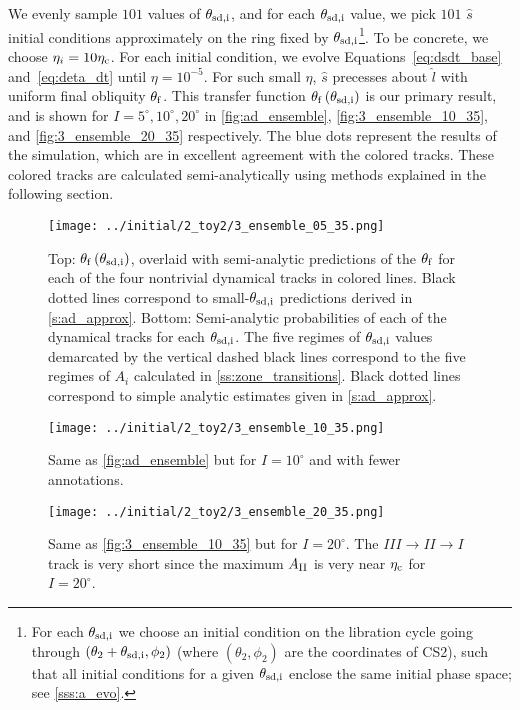 \documentclass[
        fleqn,
        usenatbib,
        referee,
    ]{mnras}
\newcommand*{\p}[1]{\left(#1\right)}
\begin{document}
We evenly sample $101$ values of $\theta_{\rm sd, i}$, and for each $\theta_{\rm
sd, i}$ value, we pick $101$ $\hat{s}$ initial conditions approximately on the
ring fixed by $\theta_{\rm sd, i}$\footnote{For each $\theta_{\rm sd, i}$ we
choose an initial condition on the libration cycle going through $\p{\theta_2 +
\theta_{\rm sd, i}, \phi_2}$ (where $\p{\theta_2, \phi_2}$ are the coordinates
of CS2), such that all initial conditions for a given $\theta_{\rm sd, i}$
enclose the same initial phase space; see \autoref{sss:a_evo}.}. To be concrete,
we choose $\eta_i = 10\eta_{\rm c}$. For each initial condition, we evolve
Equations~\ref{eq:dsdt_base} and~\ref{eq:deta_dt} until $\eta = 10^{-5}$. For
such small $\eta$, $\hat{s}$ precesses about $\hat{l}$ with uniform final
obliquity $\theta_{\rm f}$. This transfer function $\theta_{\rm f}\p{\theta_{\rm
sd, i}}$ is our primary result, and is shown for $I = 5^\circ, 10^\circ,
20^\circ$ in \autoref{fig:ad_ensemble}, \autoref{fig:3_ensemble_10_35}, and
\autoref{fig:3_ensemble_20_35} respectively. The blue dots represent the results
of the simulation, which are in excellent agreement with the colored tracks.
These colored tracks are calculated semi-analytically using methods explained in
the following section.

\begin{figure}
    \centering
    \texttt{[image: ../initial/2\_toy2/3\_ensemble\_05\_35.png]}
    \caption{Top: $\theta_{\rm f}\p{\theta_{\rm sd, i}}$, overlaid with
    semi-analytic predictions of the $\theta_{\rm  f}$ for each of the four
    nontrivial dynamical tracks in colored lines. Black dotted lines correspond
    to small-$\theta_{\rm sd, i}$ predictions derived in \autoref{s:ad_approx}.
    Bottom: Semi-analytic probabilities of each of the dynamical tracks for each
    $\theta_{\rm sd, i}$. The five regimes of $\theta_{\rm sd, i}$ values
    demarcated by the vertical dashed black lines correspond to the five regimes
    of $A_i$ calculated in \autoref{ss:zone_transitions}. Black dotted lines
    correspond to simple analytic estimates given in
    \autoref{s:ad_approx}.}\label{fig:ad_ensemble}
\end{figure}
\begin{figure}
    \centering
    \texttt{[image: ../initial/2\_toy2/3\_ensemble\_10\_35.png]}
    \caption{Same as \autoref{fig:ad_ensemble} but for $I =
    10^\circ$ and with fewer annotations.}\label{fig:3_ensemble_10_35}
\end{figure}
\begin{figure}
    \centering
    \texttt{[image: ../initial/2\_toy2/3\_ensemble\_20\_35.png]}
    \caption{Same as \autoref{fig:3_ensemble_10_35} but for $I = 20^\circ$. The
    $III \to II \to I$ track is very short since the maximum $A_{\rm II}$ is very
    near $\eta_{\rm c}$ for $I = 20^\circ$.}\label{fig:3_ensemble_20_35}
\end{figure}
\end{document}
